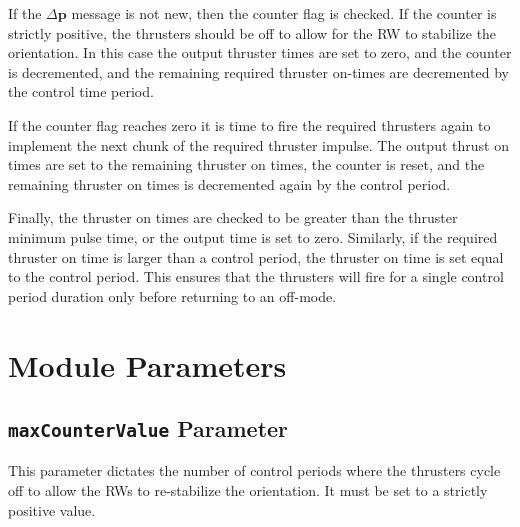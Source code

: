\documentclass[]{BasiliskReportMemo}
\begin{document}
If the $\Delta\bm p$ message is not new, then the counter flag is checked.  If the counter is strictly positive, the thrusters should be off to allow for the RW to stabilize the orientation.  In this case the output thruster times are set to zero, and the counter is decremented, and the remaining required thruster on-times are decremented by the control time period.

If the counter flag reaches zero it is time to fire the required thrusters again to implement the next chunk of the required thruster impulse.  The output thrust on times are set to the remaining thruster on times, the counter is reset, and the remaining thruster on times is decremented again by the control period.

Finally, the thruster on times are checked to be greater than the thruster minimum pulse time, or the output time is set to zero.  Similarly, if the required thruster on time is larger than a control period, the thruster on time is set equal to the control period.  This ensures that the thrusters will fire for a single control period duration only before returning to an off-mode.  



\section{Module Parameters}
\subsection{{\tt maxCounterValue} Parameter}
This parameter dictates the number of control periods where the thrusters cycle off to allow the RWs to re-stabilize the orientation.  It must be set to a strictly positive value.  
\end{document}
